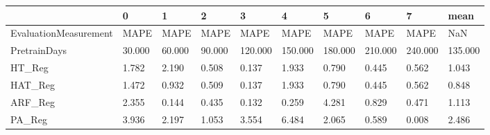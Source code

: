 \begin{tabular}{llllllllll}
\toprule
{} &      0 &      1 &      2 &       3 &       4 &       5 &       6 &       7 &    mean \\
\midrule
EvaluationMeasurement &   MAPE &   MAPE &   MAPE &    MAPE &    MAPE &    MAPE &    MAPE &    MAPE &     NaN \\
PretrainDays          & 30.000 & 60.000 & 90.000 & 120.000 & 150.000 & 180.000 & 210.000 & 240.000 & 135.000 \\
HT\_Reg                &  1.782 &  2.190 &  0.508 &   0.137 &   1.933 &   0.790 &   0.445 &   0.562 &   1.043 \\
HAT\_Reg               &  1.472 &  0.932 &  0.509 &   0.137 &   1.933 &   0.790 &   0.445 &   0.562 &   0.848 \\
ARF\_Reg               &  2.355 &  0.144 &  0.435 &   0.132 &   0.259 &   4.281 &   0.829 &   0.471 &   1.113 \\
PA\_Reg                &  3.936 &  2.197 &  1.053 &   3.554 &   6.484 &   2.065 &   0.589 &   0.008 &   2.486 \\
\bottomrule
\end{tabular}

